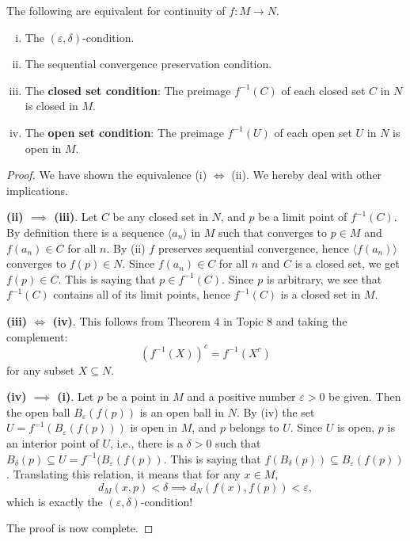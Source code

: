 \begin{thm}
  The following are equivalent for continuity of $f : M \to N$.
  \begin{enumerate}[(i)]
    \item The $(\varepsilon,\delta)$-condition.
    \item The sequential convergence preservation condition.
    \item The \textbf{closed set condition}: The preimage $f^{-1}(C)$ of each closed set $C$ in $N$ is closed in $M$.
    \item The \textbf{open set condition}: The preimage $f^{-1}(U)$ of each open set $U$ in $N$ is open in $M$.
  \end{enumerate}
\end{thm}

\begin{proof}
  We have shown the equivalence (i) $\iff$ (ii).
  We hereby deal with other implications.

  \smallskip
  \noindent\textbf{(ii) $\implies$ (iii)}.
  Let $C$ be any closed set in $N$, and $p$ be a limit point of $f^{-1}(C)$.
  By definition there is a sequence $\langle a_n \rangle$ in $M$ such that converges to $p \in M$ and $f(a_n) \in C$ for all $n$.
  By (ii) $f$ preserves sequential convergence, hence $\langle f(a_n) \rangle$ converges to $f(p) \in N$.
  Since $f(a_n) \in C$ for all $n$ and $C$ is a closed set, we get $f(p) \in C$.
  This is saying that $p \in f^{-1}(C)$.
  Since $p$ is arbitrary, we see that $f^{-1}(C)$ contains all of its limit points, hence $f^{-1}(C)$ is a closed set in $M$.

  \smallskip
  \noindent\textbf{(iii) $\iff$ (iv)}.  This follows from Theorem 4 in Topic 8 and taking the complement: $$\left( f^{-1}(X) \right)^c = f^{-1}(X^c)$$ for any subset $X \subseteq N$.

  \smallskip
  \noindent\textbf{(iv) $\implies$ (i)}.
  Let $p$ be a point in $M$ and a positive number $\varepsilon > 0$ be given.
  Then the open ball $B_\varepsilon(f(p))$ is an open ball in $N$.
  By (iv) the set $U = f^{-1}(B_\varepsilon(f(p)))$ is open in $M$, and $p$ belongs to $U$.
  Since $U$ is open, $p$ is an interior point of $U$, i.e., there is a $\delta > 0$ such that $B_\delta(p) \subseteq U = f^{-1}(B_\varepsilon(f(p))$.
  This is saying that $f(B_\delta(p)) \subseteq B_\varepsilon(f(p))$.
  Translating this relation, it means that for any $x \in M$,
  \[
    d_M(x,p) < \delta \implies d_N(f(x),f(p)) < \varepsilon,
  \]
  which is exactly the $(\varepsilon, \delta)$-condition!

  \smallskip
  The proof is now complete.
\end{proof}

